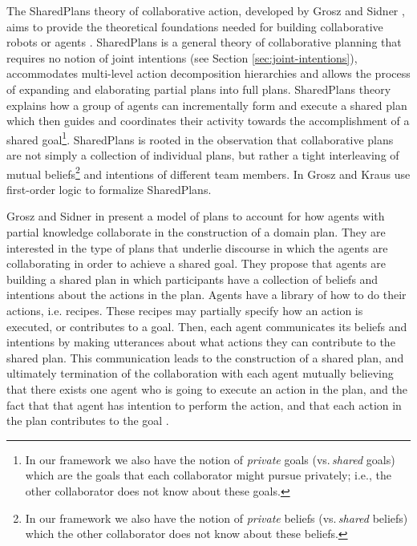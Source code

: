 \documentclass[12pt]{report}
\begin{document}
The SharedPlans theory of collaborative action, developed by Grosz and Sidner
\cite{grosz:planning-acting, grosz:collaboration, grosz:plans-discourse}, aims
to provide the theoretical foundations needed for building collaborative
robots or agents \cite{grosz:collaborative-systems}. SharedPlans is a general
theory of collaborative planning that requires no notion of joint intentions
(see Section \ref{sec:joint-intentions}), accommodates multi-level action
decomposition hierarchies and allows the process of expanding and elaborating
partial plans into full plans. SharedPlans theory explains how a group of agents
can incrementally form and execute a shared plan which then guides and
coordinates their activity towards the accomplishment of a shared
goal\footnote{In our framework we also have the notion of \textit{private} goals
(vs.\,\textit{shared} goals) which are the goals that each collaborator might
pursue privately; i.e., the other collaborator does not know about these
goals.}. SharedPlans is rooted in the observation that collaborative plans are
not simply a collection of individual plans, but rather a tight interleaving of
mutual beliefs\footnote{In our framework we also have the notion of
\textit{private} beliefs (vs.\,\textit{shared} beliefs) which the other
collaborator does not know about these beliefs.} and intentions of different
team members. In \cite{grosz:collaboration} Grosz and Kraus use first-order
logic to formalize SharedPlans.

Grosz and Sidner in \cite{grosz:plans-discourse} present a model of plans to
account for how agents with partial knowledge collaborate in the construction of
a domain plan. They are interested in the type of plans that underlie discourse
in which the agents are collaborating in order to achieve a shared goal. They
propose that agents are building a shared plan in which participants have a
collection of beliefs and intentions about the actions in the plan. Agents have
a library of how to do their actions, i.e. recipes. These recipes may partially
specify how an action is executed, or contributes to a goal. Then, each agent
communicates its beliefs and intentions by making utterances about what actions
they can contribute to the shared plan. This communication leads to the
construction of a shared plan, and ultimately termination of the collaboration
with each agent mutually believing that there exists one agent who is going to
execute an action in the plan, and the fact that that agent has intention to
perform the action, and that each action in the plan contributes to the goal
\cite{grosz:plans-discourse} \cite{lochbaum:plan-models}.
\end{document}
